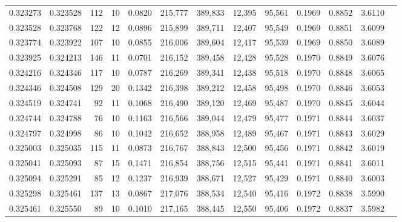 \begin{tabular}{rrrrrrrrrrrrr}
0.323273 & 0.323528 &   112 &  10 &                                     0.0820 & 215,777 & 389,833 &  12,395 &  95,561 & 0.1969 & 0.8852 & 3.6110 \\
0.323528 & 0.323768 &   122 &  12 &                                     0.0896 & 215,899 & 389,711 &  12,407 &  95,549 & 0.1969 & 0.8851 & 3.6099 \\
0.323774 & 0.323922 &   107 &  10 &                                     0.0855 & 216,006 & 389,604 &  12,417 &  95,539 & 0.1969 & 0.8850 & 3.6089 \\
0.323925 & 0.324213 &   146 &  11 &                                     0.0701 & 216,152 & 389,458 &  12,428 &  95,528 & 0.1970 & 0.8849 & 3.6076 \\
0.324216 & 0.324346 &   117 &  10 &                                     0.0787 & 216,269 & 389,341 &  12,438 &  95,518 & 0.1970 & 0.8848 & 3.6065 \\
0.324346 & 0.324508 &   129 &  20 &                                     0.1342 & 216,398 & 389,212 &  12,458 &  95,498 & 0.1970 & 0.8846 & 3.6053 \\
0.324519 & 0.324741 &    92 &  11 &                                     0.1068 & 216,490 & 389,120 &  12,469 &  95,487 & 0.1970 & 0.8845 & 3.6044 \\
0.324744 & 0.324788 &    76 &  10 &                                     0.1163 & 216,566 & 389,044 &  12,479 &  95,477 & 0.1971 & 0.8844 & 3.6037 \\
0.324797 & 0.324998 &    86 &  10 &                                     0.1042 & 216,652 & 388,958 &  12,489 &  95,467 & 0.1971 & 0.8843 & 3.6029 \\
0.325003 & 0.325035 &   115 &  11 &                                     0.0873 & 216,767 & 388,843 &  12,500 &  95,456 & 0.1971 & 0.8842 & 3.6019 \\
0.325041 & 0.325093 &    87 &  15 &                                     0.1471 & 216,854 & 388,756 &  12,515 &  95,441 & 0.1971 & 0.8841 & 3.6011 \\
0.325094 & 0.325291 &    85 &  12 &                                     0.1237 & 216,939 & 388,671 &  12,527 &  95,429 & 0.1971 & 0.8840 & 3.6003 \\
0.325298 & 0.325461 &   137 &  13 &                                     0.0867 & 217,076 & 388,534 &  12,540 &  95,416 & 0.1972 & 0.8838 & 3.5990 \\
0.325461 & 0.325550 &    89 &  10 &                                     0.1010 & 217,165 & 388,445 &  12,550 &  95,406 & 0.1972 & 0.8837 & 3.5982 \\

\end{tabular}
